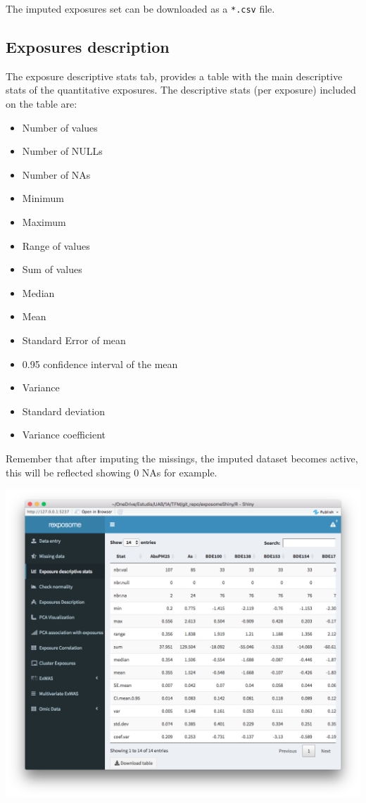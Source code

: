 \documentclass[
]{book}
\providecommand{\tightlist}{%
  \setlength{\itemsep}{0pt}\setlength{\parskip}{0pt}}
\begin{document}
The imputed exposures set can be downloaded as a \texttt{*.csv} file.

\hypertarget{exposures-description}{%
\subsection{Exposures description}\label{exposures-description}}

The exposure descriptive stats tab, provides a table with the main descriptive stats of the quantitative exposures. The descriptive stats (per exposure) included on the table are:

\begin{itemize}
\tightlist
\item
  Number of values
\item
  Number of NULLs
\item
  Number of NAs
\item
  Minimum
\item
  Maximum
\item
  Range of values
\item
  Sum of values
\item
  Median
\item
  Mean
\item
  Standard Error of mean
\item
  0.95 confidence interval of the mean
\item
  Variance
\item
  Standard deviation
\item
  Variance coefficient
\end{itemize}

Remember that after imputing the missings, the imputed dataset becomes active, this will be reflected showing 0 NAs for example.

\includegraphics{images/analysis2_4.png}
\end{document}
